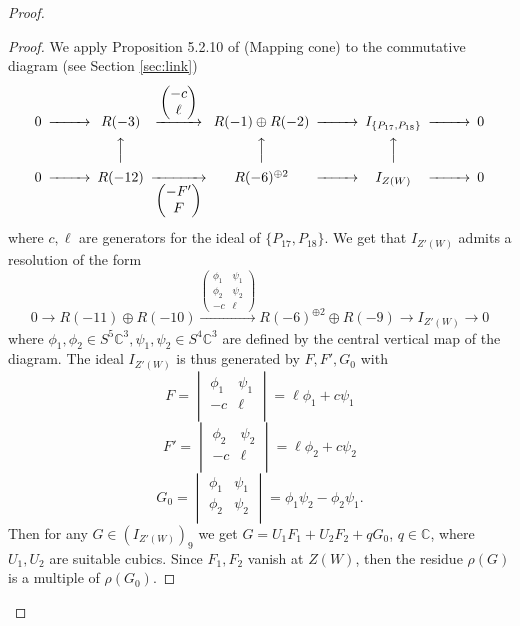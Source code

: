 \documentclass{amsart}
\newcommand{\C}{\mathbb{C}}
\theoremstyle{definition}
\begin{document}
\begin{proof}
\begin{proof}
We apply Proposition 5.2.10 of \cite{Migliore} (Mapping cone) to the commutative diagram (see Section \ref{sec:link})
$$\begin{CD}
0 @>>> R(-3) @> {\it \begin{pmatrix} -c \\ \ell \end{pmatrix}}  >> R(-1) \oplus R(-2) @>>> I_{\{P_{17},P_{18}\}} @>>> 0\\
@. @AA  A @AA    A @AAA @.  \\
0 @> >>R(-12) @>>{\it \begin{pmatrix} -F' \\ F  \end{pmatrix}} >R(-6)^{\oplus 2} @>>> I_{Z(W)} @>>> 0
\end{CD}$$
where $c,\ell$ are generators for the ideal of $\{P_{17},P_{18}\}$. We get that $ I_{Z'(W)} $ admits a resolution of the form
\begin{equation}\label{eq:idresmc}
0 \to R(-11) \oplus R(-10) \xrightarrow {\begin{pmatrix} \phi_{1} &  \psi_{1}  \\ \phi_{2} &  \psi_{2} \\ -c & \ell \end{pmatrix}} R(-6)^{\oplus 2} \oplus R(-9) \to  I_{Z'(W)}  \to 0
\end{equation}
where $ \phi_{1}, \phi_{2} \in S^{5}\C^{3}, \psi_{1}, \psi_{2} \in S^{4}\C^{3} $ are defined by the central vertical map of the diagram. 
The ideal $ I_{Z'(W)}$ is thus generated by  $F, F', G_{0} $ with
\begin{equation}\label{eq:F1bis}
F = \begin{vmatrix} \phi_{1} & \psi_{1} \\ - c  & \ell \\ \end{vmatrix} = \ell \phi_{1} + c \psi_{1}
\end{equation}
\begin{equation}\label{eq:F2bis}
F' = \begin{vmatrix} \phi_{2} & \psi_{2} \\ - c  & \ell \\ \end{vmatrix} = \ell \phi_{2} + c \psi_{2}
\end{equation}
\begin{equation}\label{eq:G_0}
G_0 = \begin{vmatrix} \phi_{1} & \psi_{1} \\ \phi_{2} & \psi_{2} \\ \end{vmatrix} = \phi_{1} \psi_{2} - \phi_{2} \psi_{1}.  
\end{equation}
Then for any $G\in (I_{Z'(W)})_9$ we get $G=U_1F_1+U_2F_2+qG_0$, $q\in\C$, where $ U_{1}, U_{2} $ are suitable cubics. 
Since $F_1,F_2$ vanish at $Z(W)$, then the residue $\rho(G) $
is a multiple of $\rho(G_0)$.  
\end{proof}


\end{proof}
\end{document}
